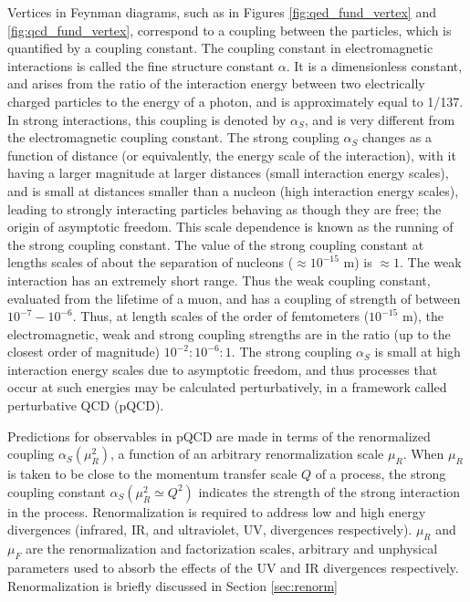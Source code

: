 \documentclass[12pt,a4paper,openright,twoside]{report}
\begin{document}
Vertices in Feynman diagrams, such as in Figures \ref{fig:qed_fund_vertex} and \ref{fig:qcd_fund_vertex}, correspond to a coupling between the particles, which is quantified by a coupling constant. The coupling constant in electromagnetic interactions is called the fine structure constant $\alpha$. It is a dimensionless constant, and arises from the ratio of the interaction energy between two electrically charged particles to the energy of a photon, and is approximately equal to 1/137. In strong interactions, this coupling is denoted by $\alpha_{S}$, and is very different from the electromagnetic coupling constant. The strong coupling $\alpha_{S}$ changes as a function of distance (or equivalently, the energy scale of the interaction), with it having a larger magnitude at larger distances (small interaction energy scales), and is small at distances smaller than a nucleon (high interaction energy scales), leading to strongly interacting particles behaving as though they are free; the origin of asymptotic freedom. This scale dependence is known as the running of the strong coupling constant. The value of the strong coupling constant at lengths scales of about the separation of nucleons ($\approx 10^{-15}$ m) is $\approx 1$. The weak interaction has an extremely short range. Thus the weak coupling constant, evaluated from the lifetime of a muon, and has a coupling of strength of between $10^{-7}-10^{-6}$. Thus, at length scales of the order of femtometers ($10^{-15}$ m), the electromagnetic, weak and strong coupling strengths are in the ratio (up to the closest order of magnitude) $10^{-2}:10^{-6}:1$. The strong coupling $\alpha_S$ is small at high interaction energy scales due to asymptotic freedom, and thus processes that occur at such energies may be calculated perturbatively, in a framework called perturbative QCD (pQCD).

Predictions for observables in pQCD are made in terms of the renormalized coupling $\alpha_S(\mu_R^2)$, a function of an arbitrary renormalization scale $\mu_R$. When $\mu_R$ is taken to be close to the momentum transfer scale $Q$ of a process, the strong coupling constant $\alpha_S(\mu_R^2 \simeq Q^2)$ indicates the strength of the strong interaction in the process. Renormalization is required to address low and high energy divergences (infrared, IR, and ultraviolet, UV, divergences respectively). $\mu_R$ and $\mu_F$ are the renormalization and factorization scales, arbitrary and unphysical parameters used to absorb the effects of the UV and IR divergences respectively. Renormalization is briefly discussed in Section \ref{sec:renorm}
\end{document}
